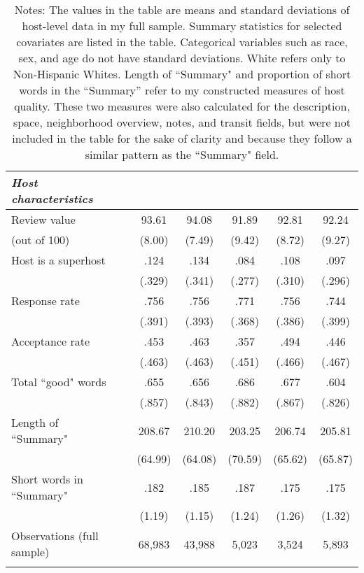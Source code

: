 {\begin{longtable}{l*{6}{c}}
		\textit{Host characteristics} \\
		\hline
		Review value      &   &      93.61	&      94.08	 	&      91.89		&    92.81	 & 		92.24\\
		(out of 100)              &      &     (8.00)         &     (7.49)         &     (9.42)         &     (8.72) 	&	 (9.27)         \\
		[1em]
		Host is a superhost    &    &      .124		&      .134&      .084 &      .108  	& 	.097\\
		& & (.329)     &     (.341)         &     (.277)         &     (.310)         &     (.296)         \\
		[1em]
		Response rate      &   &       .756		&       .756		&      .771         &      .756  	& 	.744\\
		& &     (.391)         &     (.393)         &     (.368)         &     (.386)         &		(.399)\\
		[1em]
		Acceptance rate      &     &      .453&      .463&       .357         &      .494    &	.446     \\
		& &     (.463)         &     (.463)         &     (.451)         &     (.466)         &		(.467)\\
		[1em]
		Total ``good" words       &    &      .655&      .656&       .686         &      .677    &	.604     \\
		& &     (.857)         &     (.843)         &     (.882)         &     (.867)         &		(.826)\\
		[1em]
		Length of ``Summary"      &     &      208.67 	&      210.20	&       203.25         &      206.74    &	205.81     \\
		& &       (64.99)  &    (64.08)         &     (70.59)         &     (65.62)         &     (65.87) \\
		[1em]
		Short words in ``Summary"          &  &      .182		&      .185		&       .187         &      .175    &	.175     \\
		& &     (1.19)         &     (1.15)         &     (1.24)         &     (1.26)         &		(1.32)\\                    
		
		
		\hline
		Observations (full sample)    &  & 68,983   &       43,988         &       5,023         &       3,524         &       5,893         \\
		\hline\hline
		\caption*{Notes: The values in the table are means and standard deviations of host-level data in my full sample. Summary statistics for selected covariates are listed in the table. Categorical variables such as race, sex, and age do not have standard deviations. White refers only to Non-Hispanic Whites. Length of ``Summary" and proportion of short words in the ``Summary'' refer to my constructed measures of host quality. These two measures were also calculated for the description, space, neighborhood overview, notes, and transit fields, but were not included in the table for the sake of clarity and because they follow a similar pattern as the ``Summary" field.}
		
	\end{longtable}
}

